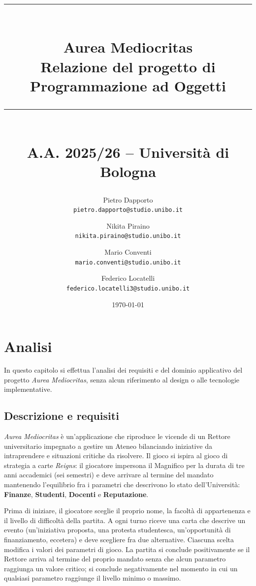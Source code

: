 \documentclass[11pt, a4paper, oneside]{report}
\title{%
    \vspace{-1.5cm}
    \rule{\linewidth}{0.5mm} \\[0.4cm]
    {\Huge \textbf{Aurea Mediocritas}} \\[0.2cm]
    {\Large Relazione del progetto di Programmazione ad Oggetti} \\ 
    \rule{\linewidth}{0.5mm} \\[0.4cm]
    {\large A.A. 2025/26 -- Universit\`a di Bologna}
}
\author{%
    Pietro Dapporto \\ \texttt{pietro.dapporto@studio.unibo.it}
    \and
    Nikita Piraino \\ \texttt{nikita.piraino@studio.unibo.it}
    \and
    Mario Conventi \\ \texttt{mario.conventi@studio.unibo.it}
    \and
    Federico Locatelli \\ \texttt{federico.locatelli3@studio.unibo.it}
}
\date{\today}
\begin{document}

\maketitle
\tableofcontents

\chapter{Analisi}
In questo capitolo si effettua l'analisi dei requisiti e del dominio applicativo
del progetto \emph{Aurea Mediocritas}, senza alcun riferimento al design o alle
tecnologie implementative.

\section{Descrizione e requisiti}
\emph{Aurea Mediocritas} \`e un'applicazione che riproduce le vicende di un
Rettore universitario impegnato a gestire un Ateneo bilanciando iniziative da
intraprendere e situazioni critiche da risolvere. Il gioco si ispira al gioco
di strategia a carte \emph{Reigns}: il giocatore impersona il Magnifico per la
durata di tre anni accademici (sei semestri) e deve arrivare al termine del
mandato mantenendo l'equilibrio fra i parametri che descrivono lo stato
dell'Universit\`a: \textbf{Finanze}, \textbf{Studenti}, \textbf{Docenti}
e \textbf{Reputazione}.

Prima di iniziare, il giocatore sceglie il proprio nome, la facolt\`a di
appartenenza e il livello di difficolt\`a della partita. A ogni turno riceve
una carta che descrive un evento (un'iniziativa proposta, una protesta
studentesca, un'opportunit\`a di finanziamento, eccetera) e deve scegliere
fra due alternative. Ciascuna scelta modifica i valori dei parametri di gioco.
La partita si conclude positivamente se il Rettore arriva al termine del
proprio mandato senza che alcun parametro raggiunga un valore critico;
si conclude negativamente nel momento in cui un qualsiasi parametro
raggiunge il livello minimo o massimo.
\end{document}
